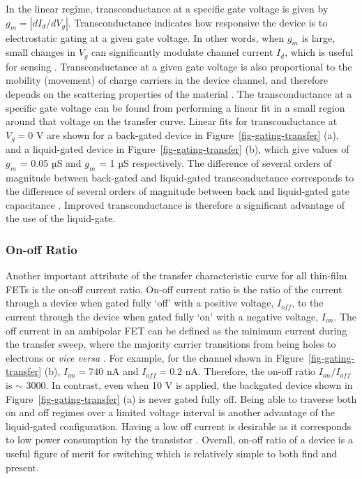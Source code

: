 \documentclass[
  a4paper,
]{scrbook}
\begin{document}
In the linear regime, transconductance at a specific gate voltage is
given by \(g_m = |dI_{d}/dV_g|\). Transconductance indicates how
responsive the device is to electrostatic gating at a given gate
voltage. In other words, when \(g_m\) is large, small changes in \(V_g\)
can significantly modulate channel current \(I_d\), which is useful for
sensing \autocite{Heller2009a,Ohno2015,Kireev2017}. Transconductance at
a given gate voltage is also proportional to the mobility (movement) of
charge carriers in the device channel, and therefore depends on the
scattering properties of the material
\autocite{Rouhi2010,Petti2016,Li2023}. The transconductance at a
specific gate voltage can be found from performing a linear fit in a
small region around that voltage on the transfer curve. Linear fits for
transconductance at \(V_g = 0\) V are shown for a back-gated device in
Figure~\ref{fig-gating-transfer} (a), and a liquid-gated device in
Figure~\ref{fig-gating-transfer} (b), which give values of \(g_m\) =
0.05 µS and \(g_m\) = 1 µS respectively. The difference of several
orders of magnitude between back-gated and liquid-gated transconductance
corresponds to the difference of several orders of magnitude between
back and liquid-gated gate capacitance \autocite{Tran2016,Shkodra2021}.
Improved transconductance is therefore a significant advantage of the
use of the liquid-gate.

\hypertarget{on-off-ratio}{%
\subsubsection*{On-off Ratio}\label{on-off-ratio}}

Another important attribute of the transfer characteristic curve for all
thin-film FETs is the on-off current ratio. On-off current ratio is the
ratio of the current through a device when gated fully `off' with a
positive voltage, \(I_{off}\), to the current through the device when
gated fully `on' with a negative voltage, \(I_{on}\). The off current in
an ambipolar FET can be defined as the minimum current during the
transfer sweep, where the majority carrier transitions from being holes
to electrons or \emph{vice versa} \autocite{Petti2016,Zheng2017}. For
example, for the channel shown in Figure~\ref{fig-gating-transfer} (b),
\(I_{on} = 740\) nA and \(I_{off} = 0.2\) nA. Therefore, the on-off
ratio \(I_{on}/I_{off}\) is \(\sim\) 3000. In contrast, even when 10 V
is applied, the backgated device shown in
Figure~\ref{fig-gating-transfer} (a) is never gated fully off. Being
able to traverse both on and off regimes over a limited voltage interval
is another advantage of the liquid-gated configuration. Having a low off
current is desirable as it corresponds to low power consumption by the
transistor \autocite{Rouhi2010}. Overall, on-off ratio of a device is a
useful figure of merit for switching which is relatively simple to both
find and present.
\end{document}
